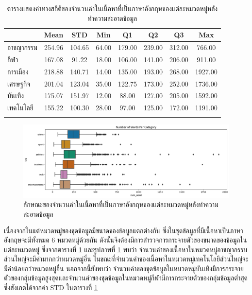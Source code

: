 \documentclass[12pt,oneside,openright,a4paper]{cpe-thai-project}
\begin{document}
        \begin{longtable}[!ht]{lccccccc}
          \caption{ตารางแสดงค่าทางสถิติของจำนวนคำในเนื้อหาที่เป็นภาษาอังกฤษของแต่ละหมวดหมู่หลังทําความสะอาดข้อมูล}
          \label{tbl:eng_stat}\\
          \hhline{========}
          \multicolumn{1}{c}{\textbf{หมวดหมู่}} & \textbf{Mean} & \textbf{STD} & \textbf{Min} & \textbf{Q1} & \textbf{Q2} & \textbf{Q3} & \textbf{Max}\\ \hline
          \endhead
          อาชญากรรม    & 254.96 & 104.65 & 64.00 & 179.00 & 239.00 & 312.00 & 766.00  \\ %
          กีฬา          & 167.08 & 91.22  & 18.00 & 106.00 & 141.00 & 206.00 & 911.00  \\ %
          การเมือง       & 218.88 & 140.71 & 14.00 & 135.00 & 193.00 & 268.00 & 1927.00  \\ %
          เศรษฐกิจ         & 201.04 & 123.04  & 35.00 & 122.75 & 173.00 & 252.00 & 1736.00  \\ %
          บันเทิง        & 175.07 & 151.97 & 12.00 & 88.00 & 127.00 & 205.00 & 1592.00  \\ %
          เทคโนโลยี     & 155.22 & 100.30 & 28.00 & 97.00 & 125.00 & 172.00 & 1191.00  \\ \hhline{========}
        \end{longtable}
        \begin{figure}[!ht]\centering
          \includegraphics[width=\textwidth]{./img/eng_stat/boxplot_tag.png}
          \caption{ลักษณะของจำนวนคำในเนื้อหาที่เป็นภาษาอังกฤษของแต่ละหมวดหมู่หลังทําความสะอาดข้อมูล}\label{fig:eng_boxplot}
        \end{figure}
        \newpage
        \hspace{1cm}เนื่องจากในแต่หมวดหมู่ของชุดข้อมูลมีขนาดของข้อมูลแตกต่างกัน ซึ่งในชุดข้อมูลที่มีเนื้อหาเป็นภาษาอังกฤษจะมีทั้งหมด 6 หมวดหมู่ด้วยกัน
        ดังนั้นจึงต้องมีการสำรวจการกระจายตัวของขนาดของข้อมูลในแต่ละหมวดหมู่ ซึ่งจากตารางที่ \ref{tbl:eng_stat} และรูปภาพที่ \ref{fig:eng_boxplot}
        พบว่า จำนวนคำของเนื้อหาในหมวดหมู่อาชญากรรมส่วนใหญ่จะมีค่ามากกว่าหมวดหมู่อื่น ในขณะที่จำนวนคำของเนื้อหาในหมวดหมู่เทคโนโลยีส่วนใหญ่จะมีค่าน้อยกว่าหมวดหมู่อื่น
        นอกจากนี้ยังพบว่า จำนวนคำของชุดข้อมูลในหมวดหมู่บันเทิงมีการกระจายตัวของกลุ่มข้อมูลสูงสุดและจำนวนคำของชุดข้อมูลในหมวดหมู่กีฬามีการกระจายตัวของกลุ่มข้อมูลต่ำสุด
        ซึ่งสังเกตได้จากค่า STD ในตารางที่ \ref{tbl:eng_stat}
\end{document}
